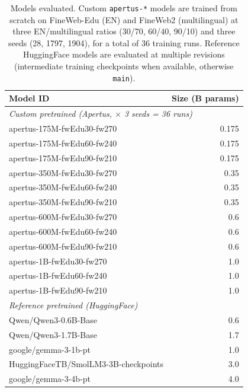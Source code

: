 \begin{table}[t]
\centering
\caption{Models evaluated. Custom \texttt{apertus-*} models are trained from scratch on FineWeb-Edu (EN) and FineWeb2 (multilingual) at three EN/multilingual ratios (30/70, 60/40, 90/10) and three seeds (28, 1797, 1904), for a total of 36 training runs. Reference HuggingFace models are evaluated at multiple revisions (intermediate training checkpoints when available, otherwise \texttt{main}).}
\label{tab:models-evaluated}
\begin{tabular}{lr}
\toprule
\textbf{Model ID} & \textbf{Size (B params)} \\
\midrule
\multicolumn{2}{l}{\emph{Custom pretrained (Apertus, $\times$ 3 seeds = 36 runs)}} \\
\midrule
apertus-175M-fwEdu30-fw270 & 0.175 \\
apertus-175M-fwEdu60-fw240 & 0.175 \\
apertus-175M-fwEdu90-fw210 & 0.175 \\
apertus-350M-fwEdu30-fw270 & 0.35 \\
apertus-350M-fwEdu60-fw240 & 0.35 \\
apertus-350M-fwEdu90-fw210 & 0.35 \\
apertus-600M-fwEdu30-fw270 & 0.6 \\
apertus-600M-fwEdu60-fw240 & 0.6 \\
apertus-600M-fwEdu90-fw210 & 0.6 \\
apertus-1B-fwEdu30-fw270   & 1.0 \\
apertus-1B-fwEdu60-fw240   & 1.0 \\
apertus-1B-fwEdu90-fw210   & 1.0 \\
\midrule
\multicolumn{2}{l}{\emph{Reference pretrained (HuggingFace)}} \\
\midrule
Qwen/Qwen3-0.6B-Base                  & 0.6 \\
Qwen/Qwen3-1.7B-Base                  & 1.7 \\
google/gemma-3-1b-pt                  & 1.0 \\
HuggingFaceTB/SmolLM3-3B-checkpoints  & 3.0 \\
google/gemma-3-4b-pt                  & 4.0 \\

\end{tabular}
\end{table}

